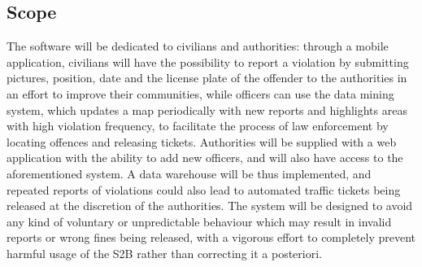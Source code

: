 \documentclass[12pt,a4paper]{article}
\begin{document}
\subsection{Scope}
The software will be dedicated to civilians and authorities: through a mobile application, civilians will have the possibility to report a violation by submitting pictures, position, date and the license plate of the offender to the authorities in an effort to improve their communities, while officers can use the data mining system, which updates a map periodically with new reports and highlights areas with high violation frequency, to facilitate the process of law enforcement by locating offences and releasing tickets. Authorities will be supplied with a web application with the ability to add new officers, and will also have access to the aforementioned system.
A data warehouse will be thus implemented, and repeated reports of violations could also lead to automated traffic tickets being released at the discretion of the authorities.
The system will be designed to avoid any kind of voluntary or unpredictable behaviour which may result in invalid reports or wrong fines being released, with a vigorous effort to completely prevent harmful usage of the S2B rather than correcting it a posteriori.
\end{document}
